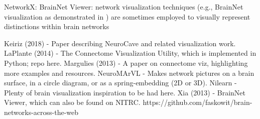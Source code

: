 NetworkX: 
BrainNet Viewer: network visualization techniques 
(e.g., BrainNet visualization as 
demonstrated in \cite{Xia2013}) are sometimes employed to visually
represent distinctions within brain networks \cite{Tang2023}


Keiriz (2018) - Paper describing NeuroCave and related visualization work.
LaPlante (2014) - The Connectome Visualization Utility, which is implemented in Python; repo here.
Margulies (2013) - A paper on connectome viz, highlighting more examples and resources.
NeuroMArVL - Makes network pictures on a brain surface, in a circle diagram, or as a spring-embedding (2D or 3D).
Nilearn - Plenty of brain visualization inspiration to be had here.
Xia (2013) - BrainNet Viewer, which can also be found on NITRC.
https://github.com/faskowit/brain-networks-across-the-web